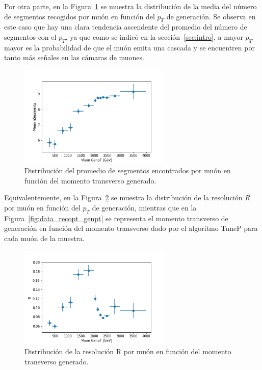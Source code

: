 Por otra parte, en la Figura~\ref{fig:data_nSegmentsMean} se muestra la distribuci\'on de la media del n\'umero de segmentos recogidos por mu\'on en funci\'on del $p_{T}$ de generaci\'on. Se observa en este caso que hay una clara tendencia ascendente del promedio del n\'umero de segmentos con el $p_{T}$, ya que como se indic\'o en la secci\'on~\ref{sec:intro}, a mayor $p_{T}$ mayor es la probabilidad de que el mu\'on emita una cascada y se encuentren por tanto m\'as se\~nales en las c\'amaras de muones. \\


\begin{figure}[h!]
\centering
\includegraphics[width=0.65\textwidth]{figures/data_genpt_MeanNSegments.png}
\caption{Distribuci\'on del promedio de segmentos encontrados por mu\'on en funci\'on del momento transverso generado.}
\label{fig:data_nSegmentsMean}        
\end{figure}

Equivalentemente, en la Figura~\ref{fig:data_R_genpt} se muestra la distribuci\'on de la resoluci\'on $R$ por mu\'on en funci\'on del $p_{T}$ de generaci\'on, mientras que en la Figura~\ref{fig:data_recopt_genpt} se representa el momento transverso de generaci\'on en funci\'on del momento transverso dado por el algoritmo TuneP para cada mu\'on de la muestra. \\

\begin{figure}[h!]
\centering
\includegraphics[width=0.65\textwidth]{figures/data_genpt_R.png}
\caption{Distribuci\'on de la resoluci\'on R por mu\'on en funci\'on del momento transverso generado.}
\label{fig:data_R_genpt}        
\end{figure}


